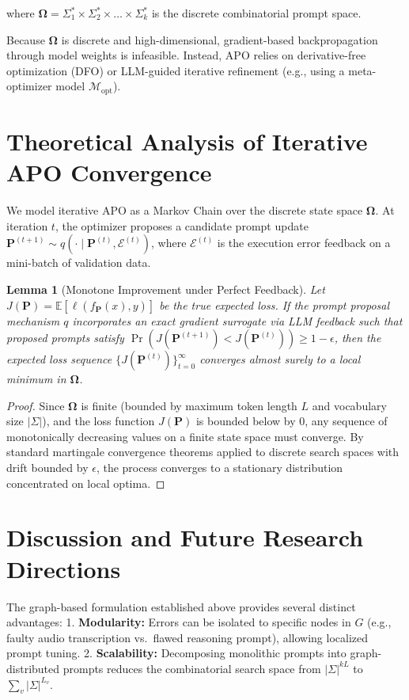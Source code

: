 \documentclass[11pt,a4paper]{article}
\newtheorem{lemma}[theorem]{Lemma}
\begin{document}
where $\boldsymbol{\Omega} = \Sigma_1^* \times \Sigma_2^* \times \dots \times \Sigma_k^*$ is the discrete combinatorial prompt space. 

Because $\boldsymbol{\Omega}$ is discrete and high-dimensional, gradient-based backpropagation through model weights is infeasible. Instead, APO relies on derivative-free optimization (DFO) or LLM-guided iterative refinement (e.g., using a meta-optimizer model $\mathcal{M}_{\text{opt}}$).

\section{Theoretical Analysis of Iterative APO Convergence}
We model iterative APO as a Markov Chain over the discrete state space $\boldsymbol{\Omega}$. At iteration $t$, the optimizer proposes a candidate prompt update $\mathbf{P}^{(t+1)} \sim q(\cdot \mid \mathbf{P}^{(t)}, \mathcal{E}^{(t)})$, where $\mathcal{E}^{(t)}$ is the execution error feedback on a mini-batch of validation data.

\begin{lemma}[Monotone Improvement under Perfect Feedback]
Let $J(\mathbf{P}) = \mathbb{E}[\ell(f_{\mathbf{P}}(x), y)]$ be the true expected loss. If the prompt proposal mechanism $q$ incorporates an exact gradient surrogate via LLM feedback such that proposed prompts satisfy $\Pr(J(\mathbf{P}^{(t+1)}) < J(\mathbf{P}^{(t)})) \ge 1 - \epsilon$, then the expected loss sequence $\{J(\mathbf{P}^{(t)})\}_{t=0}^{\infty}$ converges almost surely to a local minimum in $\boldsymbol{\Omega}$.
\end{lemma}

\begin{proof}
Since $\boldsymbol{\Omega}$ is finite (bounded by maximum token length $L$ and vocabulary size $|\Sigma|$), and the loss function $J(\mathbf{P})$ is bounded below by $0$, any sequence of monotonically decreasing values on a finite state space must converge. By standard martingale convergence theorems applied to discrete search spaces with drift bounded by $\epsilon$, the process converges to a stationary distribution concentrated on local optima.
\end{proof}

\section{Discussion and Future Research Directions}
The graph-based formulation established above provides several distinct advantages:
1. \textbf{Modularity:} Errors can be isolated to specific nodes in $G$ (e.g., faulty audio transcription vs.\ flawed reasoning prompt), allowing localized prompt tuning.
2. \textbf{Scalability:} Decomposing monolithic prompts into graph-distributed prompts reduces the combinatorial search space from $|\Sigma|^{kL}$ to $\sum_{v} |\Sigma|^{L_v}$.
\end{document}
